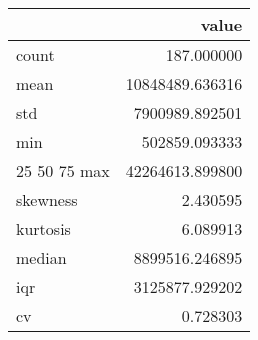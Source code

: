 \begin{tabular}{lr}
\toprule
 & value \\
\midrule
count & 187.000000 \\
mean & 10848489.636316 \\
std & 7900989.892501 \\
min & 502859.093333 \\
25%
50%
75%
max & 42264613.899800 \\
skewness & 2.430595 \\
kurtosis & 6.089913 \\
median & 8899516.246895 \\
iqr & 3125877.929202 \\
cv & 0.728303 \\
\bottomrule
\end{tabular}
